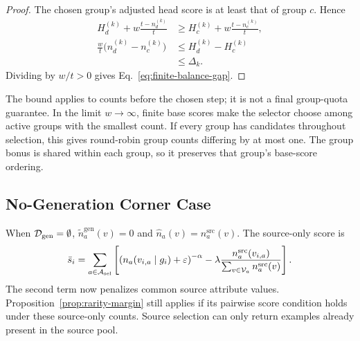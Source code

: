 \begin{tcolorbox}[
    colback=green!2!white,
    colframe=green!20!white,
    arc=3pt,
    boxrule=1pt,
    drop shadow,
    breakable
]
\begin{proof}
The chosen group's adjusted head score is at least that of group $c$. Hence
\begin{align*}
H_d^{(k)}+w\frac{t-n_d^{(k)}}{t}
&\geq H_c^{(k)}+w\frac{t-n_c^{(k)}}{t},\\
\frac{w}{t}\big(n_d^{(k)}-n_c^{(k)}\big)
&\leq H_d^{(k)}-H_c^{(k)}\\
&\leq\Delta_k.
\end{align*}
Dividing by $w/t>0$ gives Eq.~\ref{eq:finite-balance-gap}.
\end{proof}
\end{tcolorbox}

The bound applies to counts before the chosen step; it is not a final group-quota guarantee. In the limit $w\to\infty$, finite base scores make the selector choose among active groups with the smallest count. If every group has candidates throughout selection, this gives round-robin group counts differing by at most one. The group bonus is shared within each group, so it preserves that group's base-score ordering.

\subsection{No-Generation Corner Case}
\label{app:no-generation-corner-case}
When $\mathcal{D}_{\mathrm{gen}}=\emptyset$, $\tilde n_a^{\mathrm{gen}}(v)=0$ and $\hat n_a(v)=n_a^{\mathrm{src}}(v)$. The source-only score is
\begin{equation}
\label{eq:source-only-base-score}
\bar{s}_i
=\sum_{a\in\mathcal{A}_{\mathrm{sel}}}
\left[
\left(n_a(v_{i,a}\mid g_i)+\varepsilon\right)^{-\alpha}
-\lambda\frac{n_a^{\mathrm{src}}(v_{i,a})}
{\sum_{v\in\mathcal{V}_a}n_a^{\mathrm{src}}(v)}
\right].
\end{equation}
The second term now penalizes common source attribute values. Proposition~\ref{prop:rarity-margin} still applies if its pairwise score condition holds under these source-only counts. Source selection can only return examples already present in the source pool.
